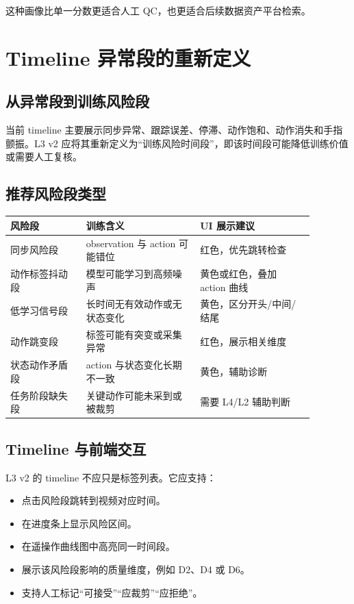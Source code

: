 \documentclass[UTF8,zihao=-4,oneside,openany]{ctexrep}
\begin{document}
这种画像比单一分数更适合人工 QC，也更适合后续数据资产平台检索。

\section{Timeline 异常段的重新定义}

\subsection{从异常段到训练风险段}

当前 timeline 主要展示同步异常、跟踪误差、停滞、动作饱和、动作消失和手指颤振。L3 v2 应将其重新定义为“训练风险时间段”，即该时间段可能降低训练价值或需要人工复核。

\subsection{推荐风险段类型}

\begin{longtable}{p{0.22\linewidth}p{0.33\linewidth}p{0.33\linewidth}}
\toprule
\textbf{风险段} & \textbf{训练含义} & \textbf{UI 展示建议} \\
\midrule
同步风险段 & observation 与 action 可能错位 & 红色，优先跳转检查 \\
动作标签抖动段 & 模型可能学习到高频噪声 & 黄色或红色，叠加 action 曲线 \\
低学习信号段 & 长时间无有效动作或无状态变化 & 黄色，区分开头/中间/结尾 \\
动作跳变段 & 标签可能有突变或采集异常 & 红色，展示相关维度 \\
状态动作矛盾段 & action 与状态变化长期不一致 & 黄色，辅助诊断 \\
任务阶段缺失段 & 关键动作可能未采到或被裁剪 & 需要 L4/L2 辅助判断 \\
\bottomrule
\end{longtable}

\subsection{Timeline 与前端交互}

L3 v2 的 timeline 不应只是标签列表。它应支持：

\begin{itemize}
  \item 点击风险段跳转到视频对应时间。
  \item 在进度条上显示风险区间。
  \item 在遥操作曲线图中高亮同一时间段。
  \item 展示该风险段影响的质量维度，例如 D2、D4 或 D6。
  \item 支持人工标记“可接受”“应裁剪”“应拒绝”。
\end{itemize}
\end{document}
